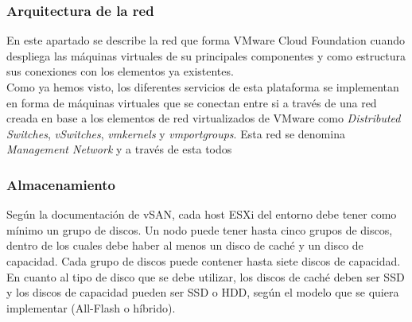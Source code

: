 \subsubsection{Arquitectura de la red}
En este apartado se describe la red que forma VMware Cloud Foundation cuando despliega las máquinas virtuales de su principales componentes y como estructura sus conexiones con los elementos ya existentes.\\
Como ya hemos visto, los diferentes servicios de esta plataforma se implementan en forma de máquinas virtuales que se conectan entre si a través de una red creada en base a los elementos de red virtualizados de VMware como \textit{Distributed Switches}, \textit{vSwitches}, \textit{vmkernels} y \textit{vmportgroups}. Esta red se denomina \textit{Management Network} y a través de esta todos 



\subsubsection{Almacenamiento}
Según la documentación de vSAN, cada host ESXi del entorno debe tener como mínimo un grupo de discos. Un nodo puede tener hasta cinco grupos de discos, dentro de los cuales debe haber al menos un disco de caché y un disco de capacidad. Cada grupo de discos puede contener hasta siete discos de capacidad.
En cuanto al tipo de disco que se debe utilizar, los discos de caché deben ser SSD y los discos de capacidad pueden ser SSD o HDD, según el modelo que se quiera implementar (All-Flash o híbrido).


